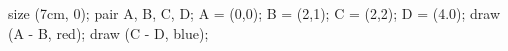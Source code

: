 \documentclass [10pt, a4paper] {article}
\begin{document}
 
\begin {asy}
size (7cm, 0);
pair A, B, C, D;
A = (0,0);
B = (2,1);
C = (2,2);
D = (4.0);
draw (A - B, red);
draw (C - D, blue);
\end {asy} 
\end{document}
